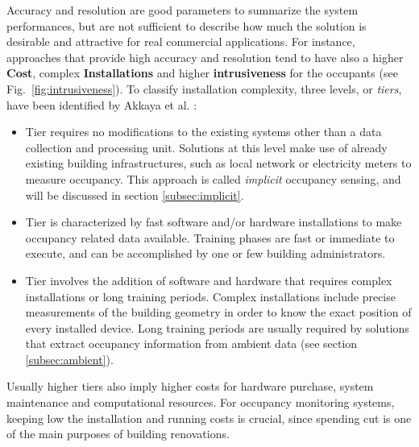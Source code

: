 \medskip
Accuracy and resolution are good parameters to summarize the system performances, but are not sufficient to describe how much the solution is desirable and attractive for real commercial applications. For instance, approaches that provide high accuracy and resolution tend to have also a higher \textbf{Cost}, complex \textbf{Installations} and higher \textbf{intrusiveness} for the occupants (see Fig.~\ref{fig:intrusiveness}). To classify installation complexity, three levels, or \emph{tiers}, have been identified by  Akkaya et al. \cite{Akkaya2015}:

\begin{itemize}
  \item Tier  requires no modifications to the existing systems other than a data collection and processing unit. Solutions at this level make use of already existing building infrastructures, such as local network or electricity meters to measure occupancy. This approach is called \emph{implicit} occupancy sensing, and will be discussed in section \ref{subsec:implicit}.
  \item Tier  is characterized by fast software and/or hardware installations to make occupancy related data available. Training phases are fast or immediate to execute, and can be accomplished by one or few building administrators.
  \item Tier  involves the addition of software and hardware that requires complex installations or long training periods. Complex installations include precise measurements of the building geometry in order to know the exact position of every installed device. Long training periods are usually required by solutions that extract occupancy information from ambient data (see section \ref{subsec:ambient}).
\end{itemize}

Usually higher tiers also imply higher costs for hardware purchase, system maintenance and computational resources. For occupancy monitoring systems, keeping low the installation and running costs is crucial, since spending cut is one of the main purposes of building renovations.

